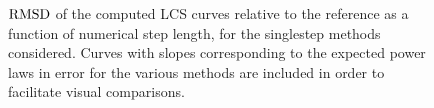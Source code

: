 \begin{figure}[htpb]
    \centering
        
    \caption[$\rmsd$ of the computed LCS curves relative to the reference as a
    function of numerical step length, for the singlestep methods considered]
        {$\rmsd$ of the computed LCS curves relative to the reference as a
        function of numerical step length, for the singlestep methods
        considered. Curves with slopes corresponding to the expected power laws
        in error for the various methods are included in order to facilitate
        visual comparisons.}
    \label{fig:lcs_rmsd_fp_nn_fixed}
\end{figure}

